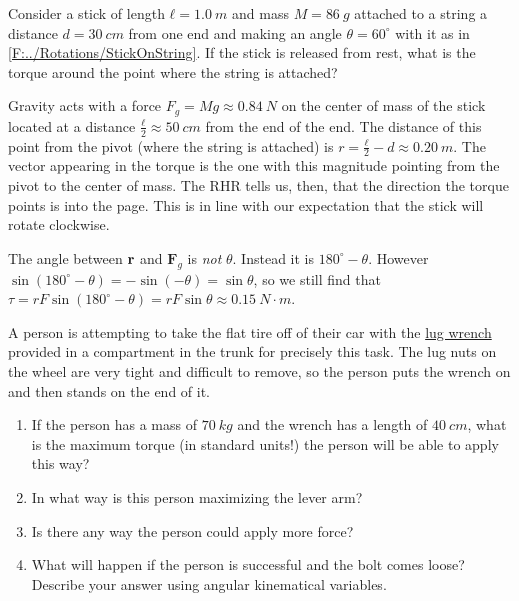 \begin{example}\label{Eg:Stick-on-string}
Consider a stick of length $ℓ=1.0\ m$ and mass $M=86\ g$ attached to a string a distance $d = 30\ cm$ from one end and making an angle $θ = 60^∘$ with it as in \ref{F:../Rotations/StickOnString}. If the stick is released from rest, what is the torque around the point where the string is attached?
\begin{solution}
Gravity acts with a force $F_g = Mg≈ 0.84\ N$ on the center of mass of the stick located at a distance $\frac ℓ2≈ 50\ cm$ from the end of the end. The distance of this point from the pivot (where the string is attached) is $r= \frac ℓ2-d ≈ 0.20\ m$. 
The vector appearing in the torque is the one with this magnitude pointing from the pivot to the center of mass. The RHR tells us, then, that the direction the torque points is into the page. This is  in line with our expectation that the stick will rotate clockwise. 

The angle between $\bf r$ and $𝐅_g$ is {\em not} $θ$. Instead it is $180^∘ - θ$. However $\sin (180^∘ - θ) = -\sin ( - θ) = \sin θ$, so we still find that $τ = rF\sin (180^∘ - θ) = rF\sin θ ≈ 0.15\ N\cdot m$.
\end{solution}
\end{example}


\begin{exercise}
A person is attempting to take the flat tire off of their car with the \href{https://en.wikipedia.org/wiki/Lug_wrench}{lug wrench} provided in a compartment in the trunk for precisely this task. The lug nuts on the wheel are very tight and difficult to remove, so the person puts the wrench on and then stands on the end of it. 
\begin{enumerate}
	\item If the person has a mass of $70\ kg$ and the wrench has a length of $40\ cm$, what is the maximum torque (in standard units!) the person will be able to apply this way? 
	\item In what way is this person maximizing the lever arm?
	\item Is there any way the person could apply more force? 
	\item What will happen if the person is successful and the bolt comes loose? Describe your answer using angular kinematical variables.
\end{enumerate}
\end{exercise}

